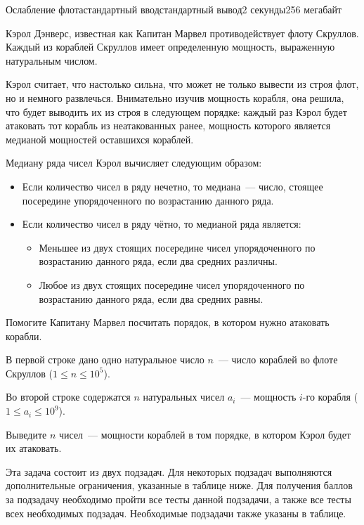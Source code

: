 \begin{problem}{Ослабление флота}{стандартный ввод}{стандартный вывод}{2 секунды}{256 мегабайт}

Кэрол Дэнверс, известная как Капитан Марвел противодействует флоту Скруллов. Каждый из кораблей Скруллов имеет
определенную мощность, выраженную натуральным числом.

Кэрол считает, что настолько сильна, что может не только вывести из строя флот, но и немного развлечься. Внимательно изучив мощность корабля, она решила, что будет выводить их из строя в следующем порядке: каждый раз Кэрол будет атаковать тот 
корабль из неатакованных ранее, мощность которого является медианой мощностей оставшихся кораблей.

Медиану ряда чисел Кэрол вычисляет следующим образом:
\begin{itemize}
  \item Если количество чисел в ряду нечетно, то медиана~--- число, стоящее посередине   упорядоченного по возрастанию данного ряда. 
  \item Если количество чисел в ряду чётно, то медианой ряда является:
  \begin{itemize}
  \item Меньшее из двух стоящих посередине чисел упорядоченного по возрастанию данного ряда, если два средних различны.
  \item Любое из двух стоящих посередине чисел упорядоченного по возрастанию данного ряда, если два средних равны.
  \end{itemize}
\end{itemize}

Помогите Капитану Марвел посчитать порядок, в котором нужно атаковать корабли.



\InputFile
В первой строке дано одно натуральное число $n$~--- число кораблей во флоте Скруллов ($1 \le n \le 10^5$).

Во второй строке содержатся $n$ натуральных чисел $a_i$~--- мощность $i$-го корабля ($1 \le a_i \le 10^9$).


\OutputFile
Выведите $n$ чисел~--- мощности кораблей в том порядке, в котором Кэрол будет их атаковать.

\Scoring
Эта задача состоит из двух подзадач. Для некоторых подзадач выполняются дополнительные ограничения, указанные в таблице ниже. Для получения баллов за подзадачу необходимо пройти все тесты данной подзадачи, а также все тесты всех необходимых подзадач. Необходимые подзадачи также указаны в таблице.


\end{problem}
